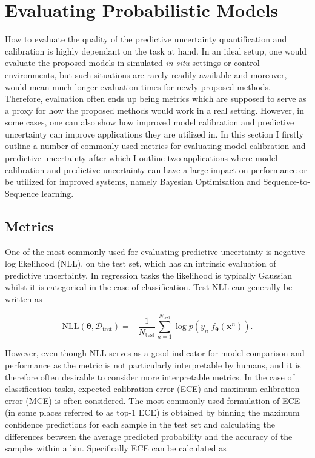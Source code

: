 \section{Evaluating Probabilistic Models}

How to evaluate the quality of the predictive uncertainty quantification and calibration is highly dependant on the task at hand. In an ideal setup, one would evaluate the proposed models in simulated \textit{in-situ} settings or control environments, but such situations are rarely readily available and moreover, would mean much longer evaluation times for newly proposed methods. Therefore, evaluation often ends up being metrics which are supposed to serve as a proxy for how the proposed methods would work in a real setting. However, in some cases, one can also show how improved model calibration and predictive uncertainty can improve applications they are utilized in. In this section I firstly outline a number of commonly used metrics for evaluating model calibration and predictive uncertainty after which I outline two applications where model calibration and predictive uncertainty can have a large impact on performance or be utilized for improved systems, namely Bayesian Optimisation and Sequence-to-Sequence learning.\\

\subsection{Metrics}
\label{sec:eval_metrics}
\noindent One of the most commonly used for evaluating predictive uncertainty is negative-log likelihood (NLL). on the test set, which has an intrinsic evaluation of predictive uncertainty. In regression tasks the likelihood is typically Gaussian whilst it is categorical in the case of classification. Test NLL can generally be written as

\begin{equation}
    \text{NLL}(\bm{\theta}, \mathcal{D}_{\text{test}}) = -\frac{1}{N_{\text{test}} }\sum^{N_{\text{test}}}_{n=1} \log p(y_n|f_{\bm{\theta}}(\mathbf{x}^n)).
\end{equation}

\noindent However, even though NLL serves as a good indicator for model comparison and performance as the metric is not particularly interpretable by humans, and it is therefore often desirable to consider more interpretable metrics. In the case of classification tasks, expected calibration error (ECE) and maximum calibration error (MCE) \citep{ECE_MCE} is often considered. The most commonly used formulation of ECE (in some places referred to as top-$1$ ECE) is obtained by binning the maximum confidence predictions for each sample in the test set and calculating the differences between the average predicted probability and the accuracy of the samples within a bin. Specifically ECE can be calculated as

